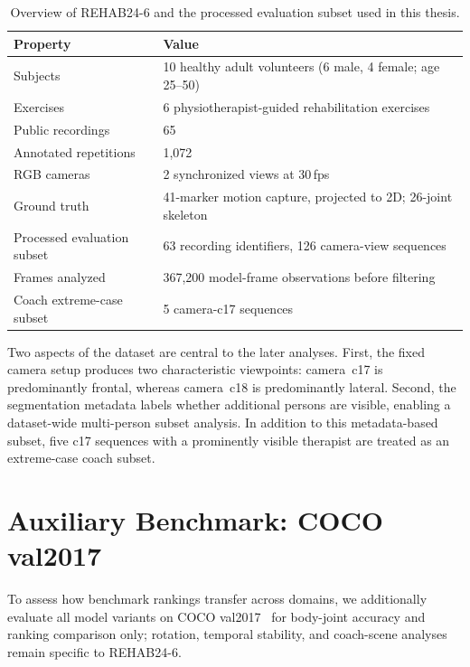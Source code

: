 \begin{table}[htbp]
  \centering
  \caption{Overview of REHAB24-6 and the processed evaluation subset used in this thesis.}
  \label{tab:dataset}
  \small
  \setlength{\tabcolsep}{4pt}
  \begin{tabular}{p{}p{}}
    \toprule
    Property & Value \\
    \midrule
    Subjects & 10 healthy adult volunteers (6 male, 4 female; age 25--50) \\
    Exercises & 6 physiotherapist-guided rehabilitation exercises \\
    Public recordings & 65 \\
    Annotated repetitions & 1{,}072 \\
    RGB cameras & 2 synchronized views at 30\,fps \\
    Ground truth & 41-marker motion capture, projected to 2D; 26-joint skeleton \\
    Processed evaluation subset & 63 recording identifiers, 126 camera-view sequences \\
    Frames analyzed & 367{,}200 model-frame observations before filtering \\
    Coach extreme-case subset & 5 camera-c17 sequences \\
    \bottomrule
  \end{tabular}
\end{table}

Two aspects of the dataset are central to the later analyses. First, the fixed camera setup produces two characteristic viewpoints: camera~c17 is predominantly frontal, whereas camera~c18 is predominantly lateral. Second, the segmentation metadata labels whether additional persons are visible, enabling a dataset-wide multi-person subset analysis. In addition to this metadata-based subset, five c17 sequences with a prominently visible therapist are treated as an extreme-case coach subset.

\section{Auxiliary Benchmark: COCO val2017}
\label{sec:coco-dataset}

To assess how benchmark rankings transfer across domains, we additionally evaluate all model variants on COCO val2017~\cite{lin2014coco} for body-joint accuracy and ranking comparison only; rotation, temporal stability, and coach-scene analyses remain specific to REHAB24-6.

